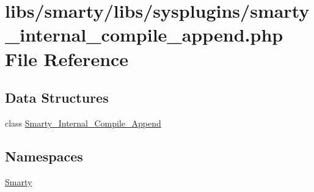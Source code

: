 \hypertarget{smarty__internal__compile__append_8php}{}\section{libs/smarty/libs/sysplugins/smarty\+\_\+internal\+\_\+compile\+\_\+append.php File Reference}
\label{smarty__internal__compile__append_8php}
\subsection*{Data Structures}
\begin{DoxyCompactItemize}
\item 
class \hyperlink{class_smarty___internal___compile___append}{Smarty\+\_\+\+Internal\+\_\+\+Compile\+\_\+\+Append}
\end{DoxyCompactItemize}
\subsection*{Namespaces}
\begin{DoxyCompactItemize}
\item 
 \hyperlink{namespace_smarty}{Smarty}
\end{DoxyCompactItemize}
